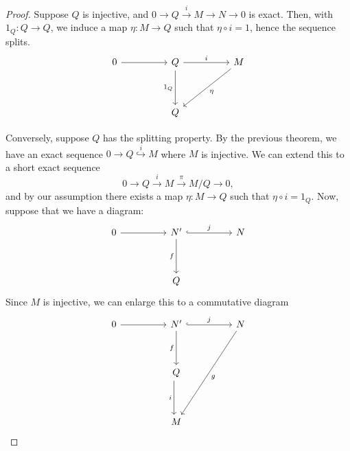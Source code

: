 \begin{proof}
    Suppose $Q$ is injective, and $0 \to Q \overset{i}{\to} M \to N \to 0$ is exact. Then, with $1_Q : Q \to Q$, we induce a map $\eta :  M \to Q$ such that $\eta \circ i=1$, hence the sequence splits.
\[\begin{tikzcd}[ampersand replacement=\&]
	0 \&\& Q \&\& M \\
	\\
	\&\& Q
	\arrow[from=1-1, to=1-3]
	\arrow["i", from=1-3, to=1-5]
	\arrow["{1_Q}"', from=1-3, to=3-3]
	\arrow["\eta", from=1-5, to=3-3]
\end{tikzcd}\]

    Conversely, suppose $Q$ has the splitting property. By the previous theorem, we have an exact sequence $0 \to Q \overset{i}{\hookrightarrow} M$ where $M$ is injective. We can extend this to a short exact sequence
    $$0 \to Q \overset{i}{\to} M \overset{\pi}{\to} M/Q \to 0,$$
    and by our assumption there exists a map $\eta:M \to Q$ such that $\eta \circ i = 1_Q$. Now, suppose that we have a diagram:
\[\begin{tikzcd}[ampersand replacement=\&]
	0 \&\& {N'} \&\& N \\
	\\
	\&\& Q
	\arrow[from=1-1, to=1-3]
	\arrow["j", hook, from=1-3, to=1-5]
	\arrow["f"', from=1-3, to=3-3]
\end{tikzcd}\]
Since $M$ is injective, we can enlarge this to a commutative diagram
\[\begin{tikzcd}[ampersand replacement=\&]
	0 \&\& {N'} \&\& N \\
	\\
	\&\& Q \\
	\\
	\&\& M
	\arrow[from=1-1, to=1-3]
	\arrow["j", hook, from=1-3, to=1-5]
	\arrow["f"', from=1-3, to=3-3]
	\arrow["g", from=1-5, to=5-3]
	\arrow["i"', shift right, from=3-3, to=5-3]

\end{tikzcd}\]
\end{proof}
